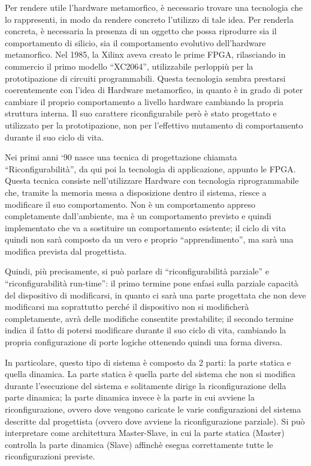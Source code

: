 \documentclass[a4paper,titlepage]{book}
\begin{document}
Per rendere utile l'hardware metamorfico, è necessario trovare una tecnologia che lo rappresenti, in modo da rendere concreto l'utilizzo di tale idea. Per renderla concreta, è necessaria la presenza di un oggetto che possa riprodurre sia il comportamento di silicio, sia il comportamento evolutivo dell'hardware metamorfico. Nel 1985, la Xilinx aveva creato le prime FPGA, rilasciando in commercio il primo modello ``XC2064'', utilizzabile perloppiù per la prototipazione di circuiti programmabili. Questa tecnologia sembra prestarsi coerentemente con l'idea di Hardware metamorfico, in quanto è in grado di poter cambiare il proprio comportamento a livello hardware cambiando la propria struttura interna. Il suo carattere riconfigurabile però è stato progettato e utilizzato per la prototipazione, non per l'effettivo mutamento di comportamento durante il suo ciclo di vita.

Nei primi anni `90 nasce una tecnica di progettazione chiamata ``Riconfigurabilità'', da qui poi la tecnologia di applicazione, appunto le FPGA. Questa tecnica consiste nell'utilizzare Hardware con tecnologia riprogrammabile che, tramite la memoria messa a disposizione dentro il sistema, riesce a modificare il suo comportamento. Non è un comportamento appreso completamente dall'ambiente, ma è un comportamento previsto e quindi implementato che va a sostituire un comportamento esistente; il ciclo di vita quindi non sarà composto da un vero e proprio ``apprendimento'', ma sarà una modifica prevista dal progettista.

Quindi, più precisamente, si può parlare di ``riconfigurabilità parziale'' e ``riconfigurabilità run-time'': il primo termine pone enfasi sulla parziale capacità del dispositivo di modificarsi, in quanto ci sarà una parte progettata che non deve modificarsi ma soprattutto perché il dispositivo non si modificherà completamente, avrà delle modifiche consentite prestabilite; il secondo termine indica il fatto di potersi modificare durante il suo ciclo di vita, cambiando la propria configurazione di porte logiche ottenendo quindi una forma diversa.

In particolare, questo tipo di sistema è composto da 2 parti: la parte statica e quella dinamica. La parte statica è quella parte del sistema che non si modifica durante l'esecuzione del sistema e solitamente dirige la riconfigurazione della parte dinamica; la parte dinamica invece è la parte in cui avviene la riconfigurazione, ovvero dove vengono caricate le varie configurazioni del sistema descritte dal progettista (ovvero dove avviene la riconfigurazione parziale).  Si può interpretare come architettura Master-Slave, in cui la parte statica (Master) controlla la parte dinamica (Slave) affinchè esegua correttamente tutte le riconfigurazioni previste.
\end{document}
